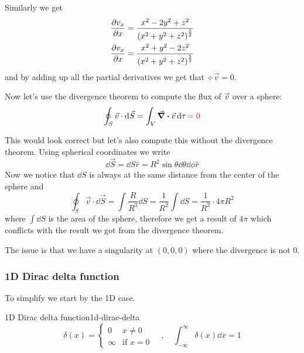 \documentclass[12pt]{extarticle}
\begin{document}
Similarly we get
\begin{align}
    \pdv{v_x}{x} & = \frac{x^2 - 2y^2 + z^2}{\left( x^2 + y^2 + z^2\right)^{\frac{5}{2}}} \\
    \pdv{v_x}{x} & = \frac{x^2 + y^2 - 2z^2}{\left( x^2 + y^2 + z^2\right)^{\frac{5}{2}}}
\end{align}
and by adding up all the partial derivatives we get that $\div \vec v = 0$.

Now let's use the divergence theorem to compute the flux of $\vec v$ over a sphere:
\begin{equation}
    \oint_S \vec v \cdot \dd{\vec S} = \int_V \div \vec v \dd{\tau} {\color{red}= 0}
    \label{eq:dirac-wrong}
\end{equation}

This would look correct but let's also compute this without the divergence theorem.
Using spherical coordinates we write
\begin{equation}
    \dd{\vec S} = \dd{S}\hat r = R^2 \sin\theta \dd{\theta} \dd{\phi} \hat r
\end{equation}
Now we notice that $\dd{S}$ is always at the same distance from the center of the sphere and
\begin{equation}
    \oint_S \vec v \cdot \dd{\vec S} = \int \frac{R}{R^3} \dd{S} = \frac{1}{R^2} \int \dd{S} = \frac{1}{R^2} \cdot 4 \pi R^2
\end{equation}
where $\int \dd{S}$ is the area of the sphere, therefore we get a result of $4\pi$ which conflicts with the result we got from the divergence theorem.

The issue is that we have a singularity at $(0,0,0)$ where the divergence is not $0$.

\subsubsection{1D Dirac delta function}

To simplify we start by the 1D case.
\begin{definition}{1D Dirac delta function}{1d-dirac-delta}
    \begin{equation}
        \delta(x) = \begin{cases}
            0      & x \ne 0          \\
            \infty & \text{if } x = 0
        \end{cases}  \quad, \quad \int_{-\infty}^{\infty} \delta(x) \dd{x} = 1
    \end{equation}
\end{definition}
\end{document}

